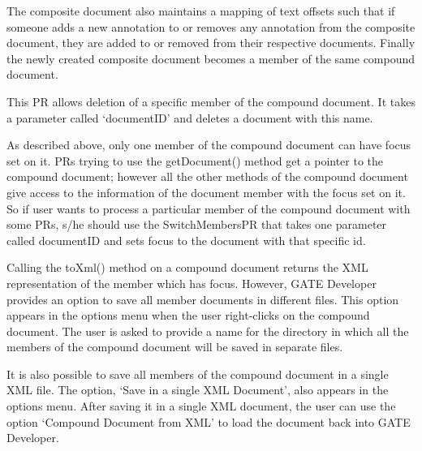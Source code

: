 The composite document also maintains a mapping of text offsets such
that if someone adds a new annotation to or removes any annotation
from the composite document, they are added to or removed from their
respective documents. Finally the newly created composite document
becomes a member of the same compound document.


This PR allows deletion of a specific member of the compound document.
It takes a parameter called `documentID' and deletes a document with
this name.


As described above, only one member of the compound document can have
focus set on it. PRs trying to use the getDocument() method get a pointer to the
compound document; however all the other methods of the compound
document give access to the information of the document member with
the focus set on it. So if user wants to process a particular member of the
compound document with some PRs, s/he should use the SwitchMembersPR
that takes one parameter called documentID and sets focus to the
document with that specific id.


Calling the toXml() method on a compound document returns the XML
representation of the member which has focus.  However, GATE Developer
provides an option to save all member documents in different files.
This option appears in the options menu when the user right-clicks on
the compound document. The user is asked to provide a name for the
directory in which all the members of the compound document will be
saved in separate files.

It is also possible to save all members of the compound document in a
single XML file. The option, `Save in a single XML Document', also
appears in the options menu. After saving it in a single XML document,
the user can use the option `Compound Document from XML' to load the
document back into GATE Developer.

